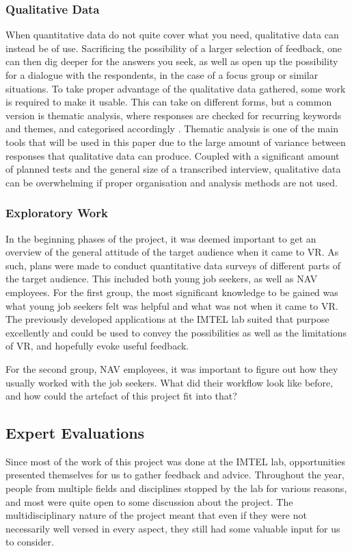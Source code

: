 \subsubsection{Qualitative Data}
When quantitative data do not quite cover what you need, qualitative data can instead be of use. Sacrificing the possibility of a larger selection of feedback, one can then dig deeper for the answers you seek, as well as open up the possibility for a dialogue with the respondents, in the case of a focus group or similar situations. To take proper advantage of the qualitative data gathered, some work is required to make it usable. This can take on different forms, but a common version is thematic analysis, where responses are checked for recurring keywords and themes, and categorised accordingly \cite{oates2005researching}. Thematic analysis is one of the main tools that will be used in this paper due to the large amount of variance between responses that qualitative data can produce. Coupled with a significant amount of planned tests and the general size of a transcribed interview, qualitative data can be overwhelming if proper organisation and analysis methods are not used.

\subsubsection{Exploratory Work}
In the beginning phases of the project, it was deemed important to get an overview of the general attitude of the target audience when it came to VR. As such, plans were made to conduct quantitative data surveys of different parts of the target audience. This included both young job seekers, as well as NAV employees. For the first group, the most significant knowledge to be gained was what young job seekers felt was helpful and what was not when it came to VR. The previously developed applications at the IMTEL lab suited that purpose excellently and could be used to convey the possibilities as well as the limitations of VR, and hopefully evoke useful feedback.

For the second group, NAV employees, it was important to figure out how they usually worked with the job seekers. What did their workflow look like before, and how could the artefact of this project fit into that?


\subsection{Expert Evaluations}
Since most of the work of this project was done at the IMTEL lab, opportunities presented themselves for us to gather feedback and advice. Throughout the year, people from multiple fields and disciplines stopped by the lab for various reasons, and most were quite open to some discussion about the project. The multidisciplinary nature of the project meant that even if they were not necessarily well versed in every aspect, they still had some valuable input for us to consider.

